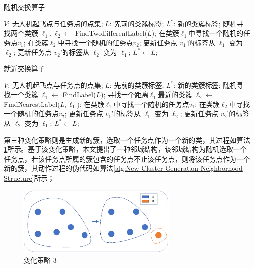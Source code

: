 \begin{algorithm}[!htbp]
  \caption{随机交换算子} %
  \label{alg:Stochastic Exchange Neighborhood Structure}
  \begin{algorithmic}[1]
    \REQUIRE
      $V$: 无人机起飞点与任务点的点集;
      $L$: 先前的类簇标签;
    \ENSURE
      $L^*$: 新的类簇标签;
    \STATE 随机寻找两个类簇 $\ell_1, \ell_2 \gets$ FindTwoDifferentLabel($L$);
    \STATE 在类簇$\ell_1$中寻找一个随机的任务点$v_1$;
    \STATE 在类簇$\ell_2$中寻找一个随机的任务点$v_2$;
    \STATE 更新任务点 $v_1$'的标签从 $\ell_1$ 变为 $\ell_2$;
    \STATE 更新任务点 $v_2$'的标签从 $\ell_2$ 变为 $\ell_1$;
    \STATE $L^* \gets L$;
  \end{algorithmic}
\end{algorithm}

\begin{algorithm}[!htbp]
  \caption{就近交换算子} %
  \label{alg:Proximity Exchange Neighborhood Structure}
  \begin{algorithmic}[1]
    \REQUIRE
      $V$: 无人机起飞点与任务点的点集;
      $L$: 先前的类簇标签;
    \ENSURE
      $L^*$: 新的类簇标签;
    \STATE 随机寻找一个类簇 $\ell_1 \gets$ FindLabel($L$);
    \STATE 寻找一个距离$\ell_1$最近的类簇 $\ell_2 \gets$ FindNearestLabel($L, \ell_1$);
    \STATE 在类簇$\ell_1$中寻找一个随机的任务点$v_1$;
    \STATE 在类簇$\ell_2$中寻找一个随机的任务点$v_2$;
    \STATE 更新任务点 $v_1$'的标签从 $\ell_1$ 变为 $\ell_2$;
    \STATE 更新任务点 $v_2$'的标签从 $\ell_2$ 变为 $\ell_1$;
    \STATE $L^* \gets L$;
  \end{algorithmic}
\end{algorithm}

第三种变化策略则是生成新的簇，选取一个任务点作为一个新的类，其过程如算法\ref{fig:Conversion_Way_3}所示。基于该变化策略，本文提出了一种邻域结构，该邻域结构为随机选取一个任务点，若该任务点所属的簇包含的任务点不止该任务点，则将该任务点作为一个新的簇，其动作过程的伪代码如算法\ref{alg:New Cluster Generation Neighborhood Structure}所示；

\begin{figure}[!htbp]
    \centering
    \includegraphics[width=0.7\textwidth]{images/全局邻域3_en.png}
    \caption{变化策略 3}
    \label{fig:Conversion_Way_3}
\end{figure}


